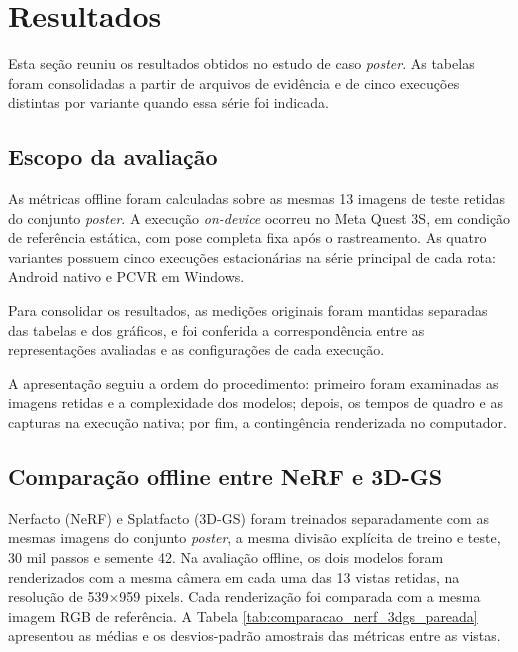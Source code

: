 \section{Resultados}

Esta seção reuniu os resultados obtidos no estudo de caso \textit{poster}. As tabelas foram consolidadas a partir de arquivos de evidência e de cinco execuções distintas por variante quando essa série foi indicada.

\subsection{Escopo da avaliação}

As métricas offline foram calculadas sobre as mesmas 13 imagens de teste retidas do conjunto \textit{poster}. A execução \textit{on-device} ocorreu no Meta Quest 3S, em condição de referência estática, com pose completa fixa após o rastreamento. As quatro variantes possuem cinco execuções estacionárias na série principal de cada rota: Android nativo e PCVR em Windows.

Para consolidar os resultados, as medições originais foram mantidas separadas das tabelas e dos gráficos, e foi conferida a correspondência entre as representações avaliadas e as configurações de cada execução.

A apresentação seguiu a ordem do procedimento: primeiro foram examinadas as imagens retidas e a complexidade dos modelos; depois, os tempos de quadro e as capturas na execução nativa; por fim, a contingência renderizada no computador.

\subsection{Comparação offline entre NeRF e 3D-GS}

Nerfacto (NeRF) e Splatfacto (3D-GS) foram treinados separadamente com as mesmas imagens do conjunto \textit{poster}, a mesma divisão explícita de treino e teste, 30 mil passos e semente 42. Na avaliação offline, os dois modelos foram renderizados com a mesma câmera em cada uma das 13 vistas retidas, na resolução de 539$\times$959 pixels. Cada renderização foi comparada com a mesma imagem RGB de referência. A Tabela \ref{tab:comparacao_nerf_3dgs_pareada} apresentou as médias e os desvios-padrão amostrais das métricas entre as vistas.

